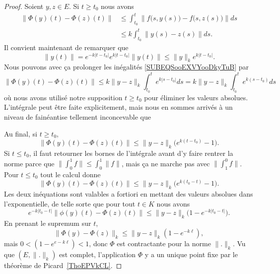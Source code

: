 \begin{proof}
    Soient \( y,z\in E\). Si \( t\geq t_0\) nous avons
    \begin{subequations}        \label{SUBEQSooEXVYooDkyTuB}
        \begin{align}
            \| \Phi(y)(t)-\Phi(z)(t) \|&\leq \int_{t_0}^t\| f\big( s,y(s) \big)-f\big( s,z(s) \big) \|ds\\
            &\leq k\int_{t_0}^t\| y(s)-z(s) \|ds.
        \end{align}
    \end{subequations}
    Il convient maintenant de remarquer que
    \begin{equation}
        \| y(t) \|= e^{-k| t-t_0 |} e^{k| t-t_0 |}\| y(t) \|\leq \| y \|_k e^{k| t-t_0 |}.
    \end{equation}
    Nous pouvons avec ça prolonger les inégalités \eqref{SUBEQSooEXVYooDkyTuB} par
    \begin{equation}
        \| \Phi(y)(t)-\Phi(z)(t) \|\leq k\| y-z \|_k\int_{t_0}^t e^{k| s-t_0 |}ds=k\| y-z \|_k\int_{t_0}^t e^{k(s-t_0)}ds
    \end{equation}
    où nous avons utilisé notre supposition \( t\geq t_0\) pour éliminer les valeurs absolues. L'intégrale peut être faite explicitement, mais nous en sommes arrivés à un niveau de fainéantise tellement inconcevable que



Au final, si \( t\geq t_0\),
    \begin{equation}
        \| \Phi(y)(t)-\Phi(z)(t) \|\leq \| y-z \|_k\big(  e^{k(t-t_0)}-1 \big).
    \end{equation}
    Si \( t\leq t_0\), il faut retourner les bornes de l'intégrale avant d'y faire rentrer la norme parce que \( \| \int_0^1f \|\leq \int_0^1\| f \|\), mais ça ne marche pas avec \( \| \int_1^0f \|\). Pour \( t\leq t_0\) tout le calcul donne
    \begin{equation}
        \| \Phi(y)(t)-\Phi(z)(t) \|\leq \| y-z \|_k\big(  e^{k(t_0-t)}-1 \big).
    \end{equation}
    Les deux inéquations sont valables a fortiori en mettant des valeurs absolues dans l'exponentielle, de telle sorte que pour tout \( t\in K\) nous avons
    \begin{equation}
        e^{-k| t_0-t |}\| \phi(y)(t)-\Phi(z)(t) \|\leq \| y-z \|_k\big( 1- e^{-k| t_0-t |} \big).
    \end{equation}
    En prenant le supremum sur \( t\),
    \begin{equation}
        \| \Phi(y)-\Phi(z) \|_k\leq \| y-z \|_k(1- e^{-k\ell}),
    \end{equation}
    mais \( 0<(1- e^{e-k\ell})<1\), donc \( \Phi\) est contractante pour la norme \( \| . \|_k\). Vu que \( (E,\| . \|_k)\) est complet, l'application \( \Phi\) y a un unique point fixe par le théorème de Picard~\ref{ThoEPVkCL}.


\end{proof}
